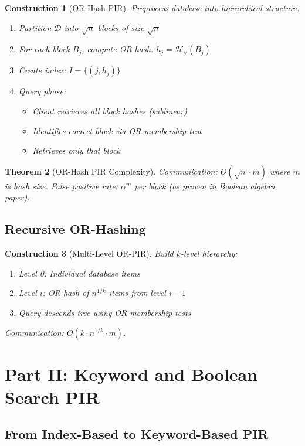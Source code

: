 \documentclass[11pt,final]{article}
\newcommand{\DB}{\mathcal{D}}
\newcommand{\OR}{\lor}
\newcommand{\HashOR}[1]{\mathcal{H}_{\OR}(#1)}
\newtheorem{theorem}{Theorem}[section]
\newtheorem{construction}[theorem]{Construction}
\begin{document}
\begin{construction}[OR-Hash PIR]
Preprocess database into hierarchical structure:
\begin{enumerate}
    \item Partition $\DB$ into $\sqrt{n}$ blocks of size $\sqrt{n}$
    \item For each block $B_j$, compute OR-hash: $h_j = \HashOR{B_j}$
    \item Create index: $I = \{(j, h_j)\}$
    \item Query phase:
    \begin{itemize}
        \item Client retrieves all block hashes (sublinear)
        \item Identifies correct block via OR-membership test
        \item Retrieves only that block
    \end{itemize}
\end{enumerate}
\end{construction}

\begin{theorem}[OR-Hash PIR Complexity]
Communication: $O(\sqrt{n} \cdot m)$ where $m$ is hash size.
False positive rate: $\alpha^m$ per block (as proven in Boolean algebra paper).
\end{theorem}

\subsection{Recursive OR-Hashing}

\begin{construction}[Multi-Level OR-PIR]
Build $k$-level hierarchy:
\begin{enumerate}
    \item Level 0: Individual database items
    \item Level $i$: OR-hash of $n^{1/k}$ items from level $i-1$
    \item Query descends tree using OR-membership tests
\end{enumerate}
Communication: $O(k \cdot n^{1/k} \cdot m)$.
\end{construction}

\section{Part II: Keyword and Boolean Search PIR}

\subsection{From Index-Based to Keyword-Based PIR}
\end{document}
